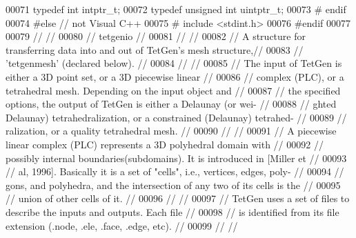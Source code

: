 \begin{DoxyCode}
00071      \textcolor{keyword}{typedef} \textcolor{keywordtype}{int} intptr\_t;
00072      \textcolor{keyword}{typedef} \textcolor{keywordtype}{unsigned} \textcolor{keywordtype}{int} uintptr\_t;
00073 \textcolor{preprocessor}{#  endif}
00074 \textcolor{preprocessor}{#else // not Visual C++}
00075 \textcolor{preprocessor}{#  include <stdint.h>}
00076 \textcolor{preprocessor}{#endif}
00077 
00079 \textcolor{comment}{//                                                                           //}
00080 \textcolor{comment}{// tetgenio                                                                  //}
00081 \textcolor{comment}{//                                                                           //}
00082 \textcolor{comment}{// A structure for transferring data into and out of TetGen's mesh structure,//}
00083 \textcolor{comment}{// 'tetgenmesh' (declared below).                                            //}
00084 \textcolor{comment}{//                                                                           //}
00085 \textcolor{comment}{// The input of TetGen is either a 3D point set, or a 3D piecewise linear    //}
00086 \textcolor{comment}{// complex (PLC), or a tetrahedral mesh.  Depending on the input object and  //}
00087 \textcolor{comment}{// the specified options, the output of TetGen is either a Delaunay (or wei- //}
00088 \textcolor{comment}{// ghted Delaunay) tetrahedralization, or a constrained (Delaunay) tetrahed- //}
00089 \textcolor{comment}{// ralization, or a quality tetrahedral mesh.                                //}
00090 \textcolor{comment}{//                                                                           //}
00091 \textcolor{comment}{// A piecewise linear complex (PLC) represents a 3D polyhedral domain with   //}
00092 \textcolor{comment}{// possibly internal boundaries(subdomains). It is introduced in [Miller et  //}
00093 \textcolor{comment}{// al, 1996]. Basically it is a set of "cells", i.e., vertices, edges, poly- //}
00094 \textcolor{comment}{// gons, and polyhedra, and the intersection of any two of its cells is the  //}
00095 \textcolor{comment}{// union of other cells of it.                                               //}
00096 \textcolor{comment}{//                                                                           //}
00097 \textcolor{comment}{// TetGen uses a set of files to describe the inputs and outputs. Each file  //}
00098 \textcolor{comment}{// is identified from its file extension (.node, .ele, .face, .edge, etc).   //}
00099 \textcolor{comment}{//                                                                           //}

\end{DoxyCode}
